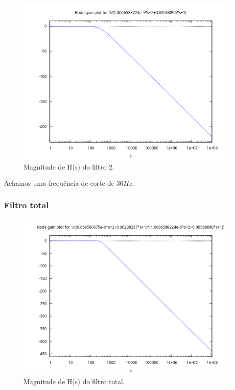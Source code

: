 \documentclass[12pt,twoside, a4paper, twocolumn]{article}
\begin{document}
\begin{figure}[htbp!]
    \centering
    \includegraphics[width=1\columnwidth]{images/bodegainH2.png}
    \caption{Magnitude de H(s) do filtro 2.}
\end{figure}


Achamos uma frequência de corte de $36Hz$.


\subsubsection{Filtro total}


\begin{figure}[htbp!]
    \centering
    \includegraphics[width=1\columnwidth]{images/bodegainHtotal.png}
    \caption{Magnitude de H(s) do filtro total.}
\end{figure}
\end{document}
